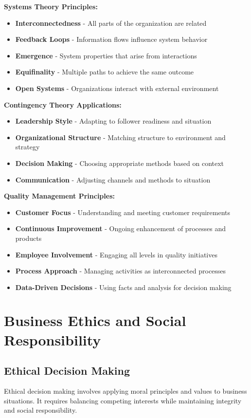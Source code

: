 \documentclass[12pt]{article}
\begin{document}
\textbf{Systems Theory Principles:}
\begin{itemize}
    \item \textbf{Interconnectedness} - All parts of the organization are related
    \item \textbf{Feedback Loops} - Information flows influence system behavior
    \item \textbf{Emergence} - System properties that arise from interactions
    \item \textbf{Equifinality} - Multiple paths to achieve the same outcome
    \item \textbf{Open Systems} - Organizations interact with external environment
\end{itemize}

\textbf{Contingency Theory Applications:}
\begin{itemize}
    \item \textbf{Leadership Style} - Adapting to follower readiness and situation
    \item \textbf{Organizational Structure} - Matching structure to environment and strategy
    \item \textbf{Decision Making} - Choosing appropriate methods based on context
    \item \textbf{Communication} - Adjusting channels and methods to situation
\end{itemize}

\textbf{Quality Management Principles:}
\begin{itemize}
    \item \textbf{Customer Focus} - Understanding and meeting customer requirements
    \item \textbf{Continuous Improvement} - Ongoing enhancement of processes and products
    \item \textbf{Employee Involvement} - Engaging all levels in quality initiatives
    \item \textbf{Process Approach} - Managing activities as interconnected processes
    \item \textbf{Data-Driven Decisions} - Using facts and analysis for decision making
\end{itemize}

\section{Business Ethics and Social Responsibility}

\subsection{Ethical Decision Making}
Ethical decision making involves applying moral principles and values to business situations. It requires balancing competing interests while maintaining integrity and social responsibility.
\end{document}

